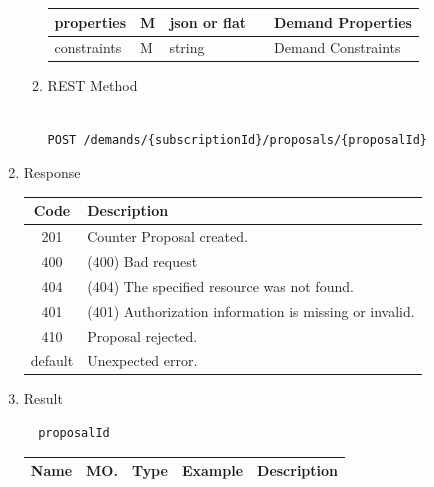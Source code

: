 \begin{enumerate}
\begin{enumerate}
\begin{center}
\begin{tabular}{|p{3cm}|l|p{3cm}|p{3cm}|p{4cm}|}
\hline	

properties		& M &	json or flat 	&		& Demand Properties		\\

\hline

constraints 	& M &	string			&		& Demand Constraints		\\

\hline

\end{tabular}
\end{center}

\item REST Method

\begin{tcolorbox}[boxrule=0pt, frame empty]
\begin{verbatim} 

POST /demands/{subscriptionId}/proposals/{proposalId}

\end{verbatim}
\end{tcolorbox}

\end{enumerate}

\item Response

\begin{center}
\begin{tabular}{|c|l|} 
\hline
\rowcolor{lightgray}	Code 		& 	Description \\
\hline
201	 		&	Counter Proposal created.  \\
\hline
400			&	(400) Bad request	\\
\hline
404			&	(404) The specified resource was not found. \\
\hline
401			&	(401) Authorization information is missing or invalid. \\
\hline
410			&	Proposal rejected. \\
\hline
default		&	Unexpected error. \\
\hline
\end{tabular}
\end{center}


\item Result

\begin{tcolorbox}[boxrule=0pt, frame empty]
\begin{verbatim}
  proposalId
\end{verbatim}
\end{tcolorbox}

\begin{center}
\begin{tabular}{|p{3cm}|l|p{3cm}|p{3cm}|p{4cm}|} 
\hline
\rowcolor{lightgray}	Name	& MO.	& Type	& Example & 	Description \\
\hline


\end{tabular}
\end{center}
\end{enumerate}
